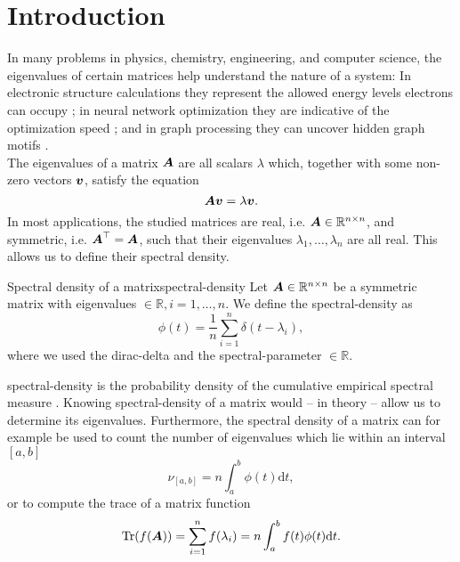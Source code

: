 \chapter{Introduction}
\label{chp:1-introduction}

In many problems in physics, chemistry, engineering, and computer science, 
the eigenvalues of certain matrices help understand the nature of a system:
In electronic structure calculations they represent the allowed energy levels 
electrons can occupy \cite{ducastelle1970charge, haydock1972electronic, lin2017randomized};
in neural network optimization they are indicative of the optimization speed \cite{ghorbani2019investigation,chen2021slq,adepu2021hessian};
and in graph processing they can uncover hidden graph motifs \cite{kruzick2018graph,huang2021kernels,patane2022filter}.\\

The eigenvalues of a matrix $\boldsymbol{A}$ are all scalars $\lambda$ which, together
with some non-zero vectors $\boldsymbol{v}$, satisfy the equation
\begin{equation}
    \boldsymbol{A} \boldsymbol{v} = \lambda \boldsymbol{v}.
    \label{equ:1-introduction-eigenvalue}
\end{equation}
In most applications, the studied matrices are real,
i.e. $\boldsymbol{A} \in \mathbb{R}^{n \times n}$, and symmetric, i.e. $\boldsymbol{A}^{\top} = \boldsymbol{A}$,
such that their eigenvalues $\lambda_1, \dots, \lambda_n$ are all real.
This allows us to define their spectral density.

\begin{definition}{Spectral density of a matrix}{spectral-density}
    Let $\boldsymbol{A} \in \mathbb{R}^{n \times n}$ be a symmetric matrix with \glspl{eigenvalue}
    $\in \mathbb{R}, i=1, \dots, n$. We define the \gls{spectral-density} as
    \begin{equation}
        \phi(t) = \frac{1}{n} \sum_{i=1}^{n} \delta(t - \lambda_i),
        \label{equ:1-introduction-def-spectral-density}
    \end{equation}
    where we used the \gls{dirac-delta}
    and the \gls{spectral-parameter} $\in \mathbb{R}$.
\end{definition}

\gls{spectral-density} is the probability density \cite{klenke2013probability}
of the cumulative empirical spectral measure \cite{chen2021slq}. Knowing \gls{spectral-density}
of a matrix would -- in theory -- allow us to determine its eigenvalues.
Furthermore, the spectral density of a matrix can for example be used to count
the number of eigenvalues which lie within an interval $[a, b]$
\begin{equation}
    \nu_{[a, b]} = n \int_{a}^{b} \phi(t) \mathrm{d}t,
    \label{equ:1-introduction-eigenvalue-counting}
\end{equation}
or to compute the trace of a matrix function \cite{lin2017randomized}
\begin{equation}
    \operatorname{Tr}(f(\boldsymbol{A})) = \sum_{i=1}^n f(\lambda_i) = n \int_{a}^{b} f(t) \phi(t) \mathrm{d}t.
    \label{equ:1-introduction-matrix-trace}
\end{equation}\\

